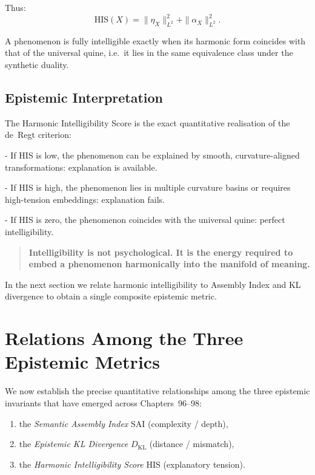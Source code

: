 Thus:
\[
\mathrm{HIS}(X)
  = \|\eta_X\|_{L^2}^2 + \|\alpha_X\|_{L^2}^2.
\]

A phenomenon is fully intelligible exactly when its harmonic form coincides
with that of the universal quine, i.e.\ it lies in the same equivalence class
under the synthetic duality.

\subsection*{Epistemic Interpretation}

The Harmonic Intelligibility Score is the exact quantitative realisation of
the de~Regt criterion:

- If HIS is low, the phenomenon can be explained by smooth, curvature-aligned
  transformations: explanation is available.

- If HIS is high, the phenomenon lies in multiple curvature basins or
  requires high-tension embeddings: explanation fails.

- If HIS is zero, the phenomenon coincides with the universal quine: perfect
  intelligibility.

\begin{quote}
\textbf{Intelligibility is not psychological.  
It is the energy required to embed a phenomenon harmonically into the
manifold of meaning.}
\end{quote}

In the next section we relate harmonic intelligibility to Assembly Index and
KL divergence to obtain a single composite epistemic metric.

\section{Relations Among the Three Epistemic Metrics}

We now establish the precise quantitative relationships among the three
epistemic invariants that have emerged across Chapters~96–98:

\begin{enumerate}
\item the \emph{Semantic Assembly Index} $\mathrm{SAI}$ (complexity / depth),
\item the \emph{Epistemic KL Divergence} $D_{\mathrm{KL}}$ (distance / mismatch),
\item the \emph{Harmonic Intelligibility Score} $\mathrm{HIS}$ (explanatory tension).
\end{enumerate}

